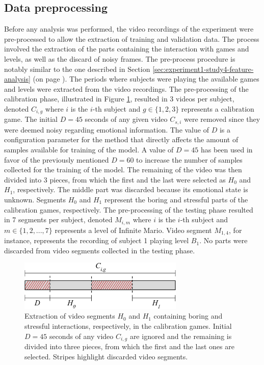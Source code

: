 \subsection{Data preprocessing}

Before any analysis was performed, the video recordings of the experiment were pre-processed to allow the extraction of training and validation data. The process involved the extraction of the parts containing the interaction with games and levels, as well as the discard of noisy frames. The pre-process procedure is notably similar to the one described in Section \ref{sec:experiment1-study4-feature-analysis} (on page \pageref{sec:experiment1-study4-feature-analysis}). The periods where subjects were playing the available games and levels were extracted from the video recordings. The pre-processing of the calibration phase, illustrated in Figure \ref{fig:experiment2-pre-processing}, resulted in 3 videos per subject, denoted $C_{i,g}$ where $i$ is the $i$-th subject and $g \in \{1, 2, 3\}$ represents a calibration game. The initial $D=45$ seconds of any given video $C_{s,i}$ were removed since they were deemed noisy regarding emotional information. The value of $D$ is a configuration parameter for the method that directly affects the amount of samples available for training of the model. A value of $D=45$ has been used in favor of the previously mentioned $D=60$ to increase the number of samples collected for the training of the model. The remaining of the video was then divided into 3 pieces, from which the first and the last were selected as $H_0$ and $H_1$, respectively. The middle part was discarded because its emotional state is unknown. Segments $H_0$ and $H_1$ represent the boring and stressful parts of the calibration games, respectively. The pre-processing of the testing phase resulted in 7 segments per subject, denoted $M_{i,m}$ where $i$ is the $i$-th subject and $m \in \{1, 2, ..., 7\}$ represents a level of Infinite Mario. Video segment $M_{1,4}$, for instance, represents the recording of subject 1 playing level $B_1$. No parts were discarded from video segments collected in the testing phase.

\begin{figure}[h]
    \centering
    \includegraphics[width=0.7\textwidth]{Content/figures/experiment2-pre-processing}
    \caption{Extraction of video segments $H_0$ and $H_1$ containing boring and stressful interactions, respectively, in the calibration games. Initial $D=45$ seconds of any video $C_{i,g}$ are ignored and the remaining is divided into three pieces, from which the first and the last ones are selected. Stripes highlight discarded video segments.}
    \label{fig:experiment2-pre-processing}
\end{figure}

